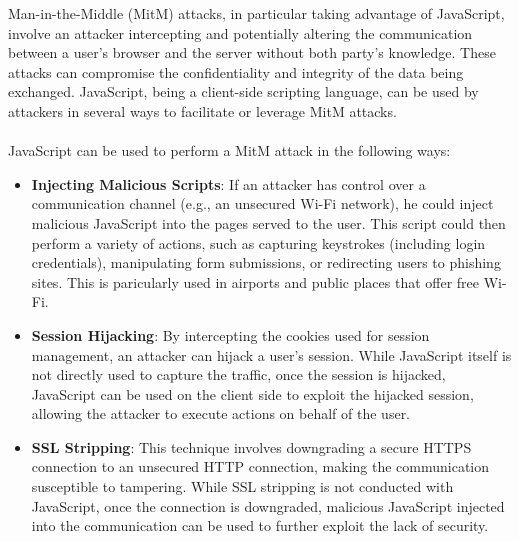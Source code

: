 \documentclass{article}
\begin{document}
Man-in-the-Middle (MitM) attacks, in particular taking advantage of JavaScript, involve an attacker intercepting and potentially altering the communication between a user's browser and the server without both party's knowledge. These attacks can compromise the confidentiality and integrity of the data being exchanged. JavaScript, being a client-side scripting language, can be used by attackers in several ways to facilitate or leverage MitM attacks.
\\
\\
JavaScript can be used to perform a MitM attack in the following ways:
\begin{itemize}
	\item \textbf{Injecting Malicious Scripts}: If an attacker has control over a communication channel (e.g., an unsecured Wi-Fi network), he could inject malicious JavaScript into the pages served to the user. This script could then perform a variety of actions, such as capturing keystrokes (including login credentials), manipulating form submissions, or redirecting users to phishing sites. This is paricularly used in airports and public places that offer free Wi-Fi.
	\item \textbf{Session Hijacking}: By intercepting the cookies used for session management, an attacker can hijack a user's session. While JavaScript itself is not directly used to capture the traffic, once the session is hijacked, JavaScript can be used on the client side to exploit the hijacked session, allowing the attacker to execute actions on behalf of the user.
	\item \textbf{SSL Stripping}: This technique involves downgrading a secure HTTPS connection to an unsecured HTTP connection, making the communication susceptible to tampering. While SSL stripping is not conducted with JavaScript, once the connection is downgraded, malicious JavaScript injected into the communication can be used to further exploit the lack of security.
\end{itemize}
\end{document}
